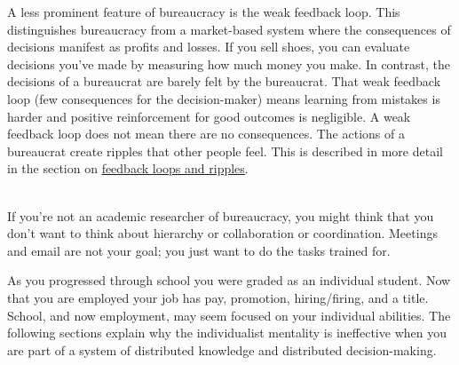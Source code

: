 A less prominent feature of bureaucracy is the weak \gls{feedback loop}. This distinguishes bureaucracy from a market-based system where the consequences of decisions manifest as profits and losses. If you sell shoes, you can evaluate decisions you've made by measuring how much money you make. In contrast, the decisions of a bureaucrat are barely felt by the bureaucrat. That weak feedback loop (few consequences for the decision-maker) means learning from mistakes is harder and positive reinforcement for good outcomes is negligible. A weak feedback loop does not mean there are no consequences. The actions of a bureaucrat create ripples that other people feel. This is described in more detail in the section on \hyperref[sec:feedback-loop-and-ripples]{feedback loops and ripples}.

\ \\

If you're not an academic researcher of bureaucracy, you might think that you don't want to think about hierarchy or collaboration or coordination. Meetings and email are not your goal; you just want to do the tasks trained for. 

As you progressed through school you were graded as an individual student. Now that you are employed your job has pay, promotion, hiring/firing, and a title. School, and now employment, may seem focused on your individual abilities. The following sections explain why the individualist mentality is ineffective when you are part of a system of distributed knowledge and distributed decision-making. 


